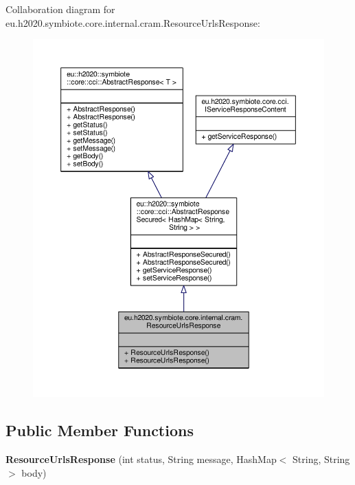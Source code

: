 Collaboration diagram for eu.\+h2020.\+symbiote.\+core.\+internal.\+cram.\+Resource\+Urls\+Response\+:
\nopagebreak
\begin{figure}[H]
\begin{center}
\leavevmode
\includegraphics[width=350pt]{classeu_1_1h2020_1_1symbiote_1_1core_1_1internal_1_1cram_1_1ResourceUrlsResponse__coll__graph}
\end{center}
\end{figure}
\subsection*{Public Member Functions}
\begin{DoxyCompactItemize}
\item 
\mbox{\label{classeu_1_1h2020_1_1symbiote_1_1core_1_1internal_1_1cram_1_1ResourceUrlsResponse_a3c313231c2ebbf3e03c8b1b87da10d2f}} 
{\bfseries Resource\+Urls\+Response} (int status, String message, Hash\+Map$<$ String, String $>$ body)
\end{DoxyCompactItemize}


